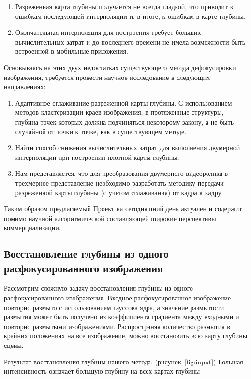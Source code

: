 \begin{enumerate}
	\item Разреженная карта глубины получается не всегда гладкой, что приводит к ошибкам последующей интерполяции и, в итоге, к ошибкам в карте глубины. 
	\item Окончательная интерполяция для построения требует больших вычислительных затрат и до последнего времени не имела возможности быть встроенной в мобильные приложения. 
\end{enumerate}

Основываясь на этих двух недостатках существующего метода дефокусировки изображения, требуется провести научное исследование в следующих направлениях:

\begin{enumerate}
	\item Адаптивное сглаживание разреженной карты глубины.  С использованием методов кластеризации краев изображения, в протяженные структуры, глубина точек которых должна подчиняться некоторому закону, а не быть случайной от точки к точке, как в существующем методе. 
	\item Найти способ снижения вычислительных затрат для выполнения двумерной интерполяции при построении плотной карты глубины. 
	\item Нам представляется, что для преобразования двумерного видеоролика в трехмерное представление необходимо разработать методику передачи разреженной карты глубины (с учетом сглаживания) от кадра к кадру. 
\end{enumerate}

Таким образом предлагаемый Проект на сегодняшний день актуален и содержит помимо научной алгоритмической составляющей широкие перспективы коммерциализации.

\subsection{Восстановление глубины из одного расфокусированного изображения}

Рассмотрим сложную задачу восстановления глубины из одного расфокусированного изображения. Входное расфокусированное изображение повторно размыто с использованием гауссова ядра, а значение размытости размытия может быть получено из коэффициента градиента между входными и повторно размытыми изображениями. Распространяя количество размытия в крайних положениях на все изображение, можно восстановить всю карту глубины сцены.

Результат восстановления глубины нашего метода. (рисунок~\ref{fig:input}) Большая интенсивность означает большую глубину на всех картах глубины

